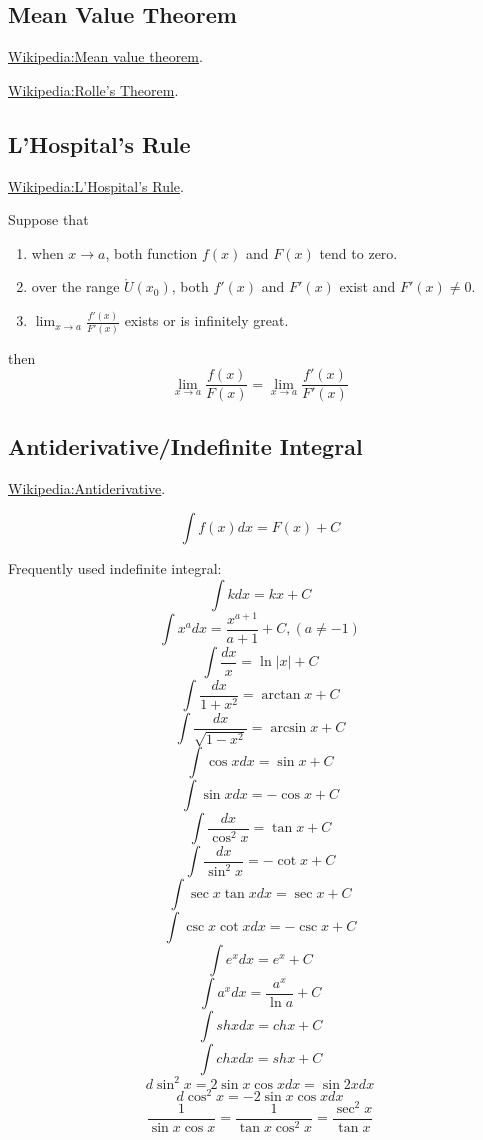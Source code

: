 \subsection{Mean Value Theorem}

 \href{https://en.wikipedia.org/wiki/Mean_value_theorem}
 {Wikipedia:Mean value theorem}.

 \href{https://en.wikipedia.org/wiki/Rolle's_theorem}
 {Wikipedia:Rolle's Theorem}.

\subsection{L'Hospital's Rule}

 \href{https://en.wikipedia.org/wiki/L%27H%C3%B4pital%27s_rule}
 {Wikipedia:L'Hospital's Rule}.

 Suppose that
 \begin{enumerate}
 \item when $x\rightarrow a$, both function $f(x)$ and $F(x)$ tend to zero.
 \item over the range $\mathring{U}(x_0)$, both $f'(x)$ and $F'(x)$ exist and $F'(x)\neq 0$.
 \item $\lim_{x\rightarrow a} \frac{f'(x)}{F'(x)}$ exists or is infinitely great.
 \end{enumerate}
 then
 $$ \lim\limits_{x\rightarrow a} \frac{f(x)}{F(x)} = \lim\limits_{x\rightarrow a} \frac{f'(x)}{F'(x)} $$

\subsection{Antiderivative/Indefinite Integral}

 \href{https://en.wikipedia.org/wiki/Antiderivative}
 {Wikipedia:Antiderivative}.

$$ \int f(x) dx = F(x) + C $$

Frequently used indefinite integral:
$$ \int k dx = kx + C$$
$$ \int x^a dx = \frac{x^{a+1}}{a+1}  + C, (a\neq -1)$$
$$ \int \frac{dx}{x} = \ln|x| + C$$
$$ \int \frac{dx}{1+x^2} = \arctan x + C$$
$$ \int \frac{dx}{\sqrt{1-x^2}} = \arcsin x + C$$
$$ \int \cos x dx = \sin x + C$$
$$ \int \sin x dx = -\cos x + C$$
$$ \int \frac{dx}{\cos^2 x} = \tan x + C$$
$$ \int \frac{dx}{\sin^2 x} = -\cot x + C$$
$$ \int \sec x \tan x dx = \sec x + C$$
$$ \int \csc x \cot x dx = -\csc x + C$$
$$ \int e^x dx = e^x + C$$
$$ \int a^x dx = \frac{a^x}{\ln a} + C$$
$$ \int sh x dx = ch x + C$$
$$ \int ch x dx = sh x + C$$
$$ d \sin^2 x = 2\sin x \cos x dx = \sin 2x dx $$
$$ d \cos^2 x = -2\sin x \cos x dx $$
$$ \frac{1}{\sin x \cos x} = \frac{1}{\tan x \cos^2 x} = \frac{\sec^2 x}{\tan x} $$

